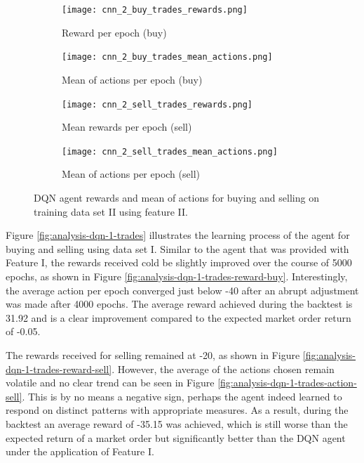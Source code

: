 \begin{figure}[H]
    \centering
    \begin{subfigure}[b]{0.45\textwidth}
        \texttt{[image: cnn\_2\_buy\_trades\_rewards.png]}
        \caption{Reward per epoch (buy)}
        \label{fig:analysis-dqn-2-trades-reward-buy}
    \end{subfigure}
    \begin{subfigure}[b]{0.45\textwidth}
        \texttt{[image: cnn\_2\_buy\_trades\_mean\_actions.png]}
        \caption{Mean of actions per epoch (buy)}
        \label{fig:analysis-dqn-2-trades-action-buy}
    \end{subfigure}
    \begin{subfigure}[b]{0.45\textwidth}
        \texttt{[image: cnn\_2\_sell\_trades\_rewards.png]}
        \caption{Mean rewards per epoch (sell)}
        \label{fig:analysis-dqn-2-trades-reward-sell}
    \end{subfigure}
    \begin{subfigure}[b]{0.45\textwidth}
        \texttt{[image: cnn\_2\_sell\_trades\_mean\_actions.png]}
        \caption{Mean of actions per epoch (sell)}
        \label{fig:analysis-dqn-2-trades-action-sell}
    \end{subfigure}
    \caption{DQN agent rewards and mean of actions for buying and selling on training data set II using feature II.}
    \label{fig:analysis-dqn-2-trades}
\end{figure}

Figure \ref{fig:analysis-dqn-1-trades} illustrates the learning process of the agent for buying and selling using data set I.
Similar to the agent that was provided with Feature I, the rewards received cold be slightly improved over the course of 5000 epochs, as shown in Figure \ref{fig:analysis-dqn-1-trades-reward-buy}.
Interestingly, the average action per epoch converged just below -40 after an abrupt adjustment was made after 4000 epochs.
The average reward achieved during the backtest is 31.92 and is a clear improvement compared to the expected market order return of -0.05.

The rewards received for selling remained at -20, as shown in Figure \ref{fig:analysis-dqn-1-trades-reward-sell}.
However, the average of the actions chosen remain volatile and no clear trend can be seen in Figure \ref{fig:analysis-dqn-1-trades-action-sell}.
This is by no means a negative sign, perhaps the agent indeed learned to respond on distinct patterns with appropriate measures.
As a result, during the backtest an average reward of -35.15 was achieved, which is still worse than the expected return of a market order but significantly better than the DQN agent under the application of Feature I.

